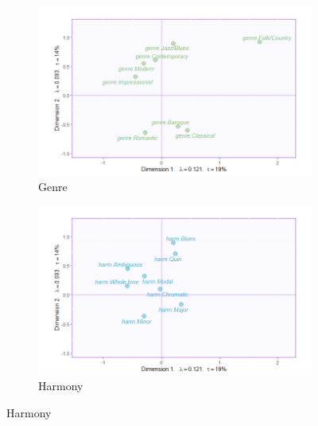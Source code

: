 \documentclass[
]{article}
\begin{document}
\begin{figure}
\begin{subfigure}[b]{.45\linewidth}
\includegraphics[width=\linewidth]{./supmatsimgs/qjgenre.png}
\caption{Genre}\label{fig:genre}
\end{subfigure}
\begin{subfigure}[b]{.45\linewidth}
\includegraphics[width=\linewidth]{./supmatsimgs/qjharmony.png}
\caption{Harmony}\label{fig:harmony}
\end{subfigure}


\end{figure}
\end{document}
